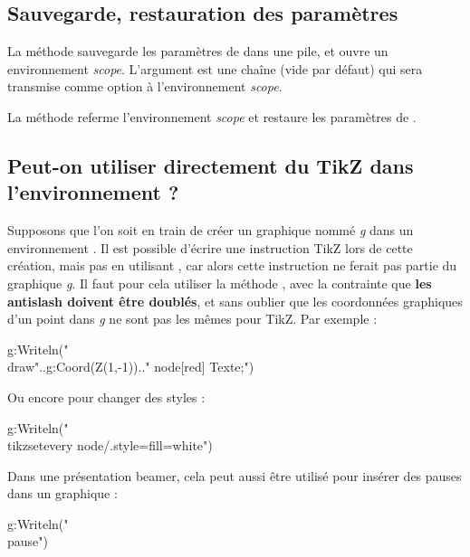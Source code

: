 \subsection{Sauvegarde, restauration des paramètres}

La méthode  sauvegarde les paramètres de \luadrawenv dans une pile, et ouvre un environnement \emph{scope}. L'argument  est une chaîne (vide par défaut) qui sera transmise comme option à l'environnement \emph{scope}.

La méthode  referme l'environnement \emph{scope} et restaure les paramètres de \luadrawenv.

\subsection{Peut-on utiliser directement du TikZ dans l'environnement \luadrawenv ?}

Supposons que l'on soit en train de créer un graphique nommé \emph{g} dans un environnement \luadrawenv. Il est possible d'écrire une instruction TikZ lors de cette création, mais pas en utilisant , car alors cette instruction ne ferait pas partie du graphique \emph{g}. Il faut pour cela utiliser la méthode , avec la contrainte que \textbf{les antislash doivent être doublés}, et sans oublier que les coordonnées graphiques d'un point dans \emph{g} ne sont pas les mêmes pour TikZ. Par exemple : 

\begin{Luacode}
g:Writeln("\\draw"..g:Coord(Z(1,-1)).." node[red] {Texte};")
\end{Luacode}

Ou encore pour changer des styles :
\begin{Luacode}
g:Writeln("\\tikzset{every node/.style={fill=white}}")
\end{Luacode}

Dans une présentation beamer, cela peut aussi être utilisé pour insérer des pauses dans un graphique :
\begin{Luacode}
g:Writeln("\\pause")
\end{Luacode}  
